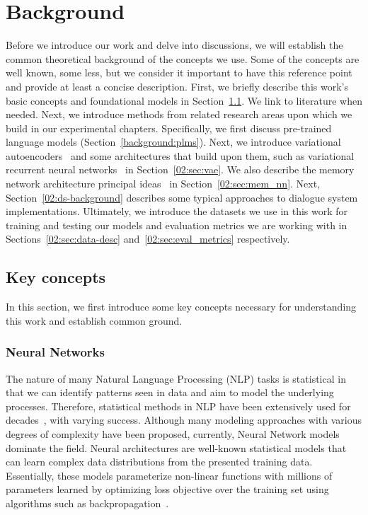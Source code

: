 \chapter{Background}%
\label{chap:background}
Before we introduce our work and delve into discussions, we will establish the common theoretical background of the concepts we use.
Some of the concepts are well known, some less, but we consider it important to have this reference point and provide at least a concise description.
First, we briefly describe this work's basic concepts and foundational models in Section~\ref{02:sec:basics}.
We link to literature when needed.
Next, we introduce methods from related research areas upon which we build in our experimental chapters.
Specifically, we first discuss pre-trained language models (Section~\ref{background:plms}).
Next, we introduce variational autoencoders~\cite{kingma2013auto} and some architectures that build upon them, such as variational recurrent neural networks~\cite{chung2015recurrent} in Section~\ref{02:sec:vae}.
We also describe the memory network architecture principal ideas~\cite{DBLP:journals/corr/WestonCB14} in Section~\ref{02:sec:mem_nn}.
Next, Section~\ref{02:ds-background} describes some typical approaches to dialogue system implementations.
Ultimately, we introduce the datasets we use in this work for training and testing our models and evaluation metrics we are working with in Sections~\ref{02:sec:data-desc} and~\ref{02:sec:eval_metrics} respectively.

\section{Key concepts}
\label{02:sec:basics}
In this section, we first introduce some key concepts necessary for understanding this work and establish common ground.

\subsection{Neural Networks}
\label{background:nns}
The nature of many Natural Language Processing (NLP) tasks is statistical in that we can identify patterns seen in data and aim to model the underlying processes.
Therefore, statistical methods in NLP have been extensively used for decades~\cite{manning99foundations}, with varying success.
Although many modeling approaches with various degrees of complexity have been proposed, currently, Neural Network models dominate the field.
Neural architectures are well-known statistical models \cite{GoodBengCour16} that can learn complex data distributions from the presented training data.
Essentially, these models parameterize non-linear functions with millions of parameters learned by optimizing loss objective over the training set using algorithms such as backpropagation~\cite{kelley1960gradient}.


